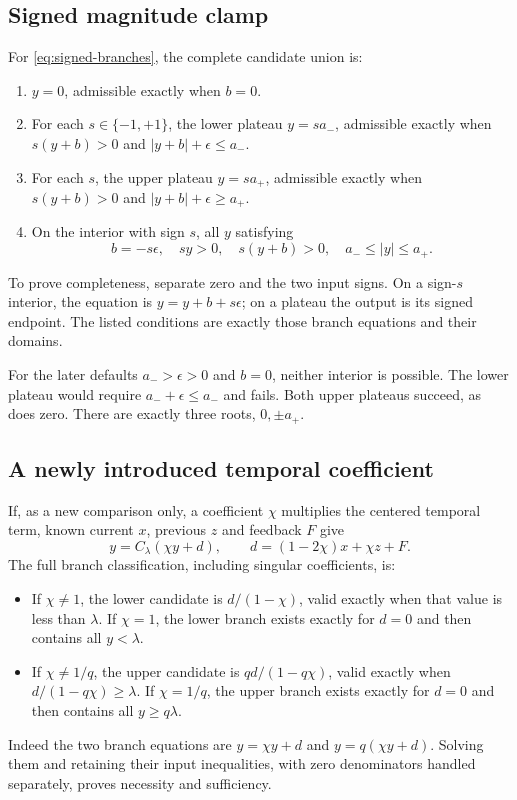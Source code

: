 \documentclass[11pt,a4paper]{article}
\theoremstyle{definition}
\numberwithin{equation}{section}
\begin{document}
\subsection{Signed magnitude clamp}

For \eqref{eq:signed-branches}, the complete candidate union is:
\begin{enumerate}
\item $y=0$, admissible exactly when $b=0$.
\item For each $s\in\{-1,+1\}$, the lower plateau $y=sa_-$,
admissible exactly when $s(y+b)>0$ and $|y+b|+\epsilon\leq a_-$.
\item For each $s$, the upper plateau $y=sa_+$, admissible exactly
when $s(y+b)>0$ and $|y+b|+\epsilon\geq a_+$.
\item On the interior with sign $s$, all $y$ satisfying
\[
 b=-s\epsilon,\quad sy>0,\quad s(y+b)>0,\quad
 a_-\leq|y|\leq a_+.
\]
\end{enumerate}
To prove completeness, separate zero and the two input signs.
On a sign-$s$ interior, the equation is $y=y+b+s\epsilon$;
on a plateau the output is its signed endpoint. The listed conditions
are exactly those branch equations and their domains.

For the later defaults $a_->\epsilon>0$ and $b=0$, neither interior
is possible. The lower plateau would require
$a_-+\epsilon\leq a_-$ and fails. Both upper plateaus succeed, as does
zero. There are exactly three roots, $0,\pm a_+$.

\subsection{A newly introduced temporal coefficient}
\label{app:coefficient}

If, as a new comparison only, a coefficient $\chi$ multiplies the
centered temporal term, known current $x$, previous $z$ and feedback $F$
give
\begin{equation}
 y=C_\lambda(\chi y+d),\qquad
 d=(1-2\chi)x+\chi z+F.
 \label{eq:chi}
\end{equation}
The full branch classification, including singular coefficients, is:
\begin{itemize}
\item If $\chi\ne1$, the lower candidate is $d/(1-\chi)$,
valid exactly when that value is less than $\lambda$.
If $\chi=1$, the lower branch exists exactly for $d=0$ and
then contains all $y<\lambda$.
\item If $\chi\ne1/q$, the upper candidate is $qd/(1-q\chi)$,
valid exactly when $d/(1-q\chi)\geq\lambda$.
If $\chi=1/q$, the upper branch exists exactly for $d=0$ and
then contains all $y\geq q\lambda$.
\end{itemize}
Indeed the two branch equations are $y=\chi y+d$ and
$y=q(\chi y+d)$. Solving them and retaining their input inequalities,
with zero denominators handled separately, proves necessity and sufficiency.
\end{document}
